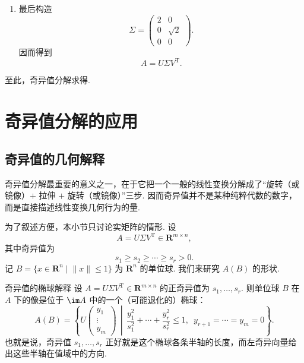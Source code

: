 \begin{solution}
\begin{enumerate}
        \item 最后构造
              \[
                  \Sigma =
                  \begin{pmatrix}
                      2 & 0        \\
                      0 & \sqrt{2} \\
                      0 & 0
                  \end{pmatrix}.
              \]
              因而得到
              \[
                  A = U\Sigma V^{\mathrm{T}}.
              \]
    \end{enumerate}

    至此，奇异值分解求得.
\end{solution}

\section{奇异值分解的应用}

\subsection{奇异值的几何解释}

奇异值分解最重要的意义之一，在于它把一个一般的线性变换分解成了“旋转（或镜像）$+$ 拉伸 $+$ 旋转（或镜像）”三步. 因而奇异值并不是某种纯粹代数的数字，而是直接描述线性变换几何行为的量.

为了叙述方便，本小节只讨论实矩阵的情形. 设
\[
    A = U\Sigma V^{\mathrm{T}} \in \mathbf{R}^{m \times n},
\]
其中奇异值为
\[
    s_1 \geqslant s_2 \geqslant \cdots \geqslant s_r > 0.
\]
记 $ B = \{x \in \mathbf{R}^n \mid \lVert x \rVert \leqslant 1\} $ 为 $ \mathbf{R}^n $ 的单位球. 我们来研究 $ A(B) $ 的形状.

\begin{theorem}{}{奇异值的椭球解释}
    设 $ A = U\Sigma V^{\mathrm{T}} \in \mathbf{R}^{m \times n} $ 的正奇异值为 $ s_1, \ldots, s_r $. 则单位球 $ B $ 在 $ A $ 下的像是位于 $ \im A $ 中的一个（可能退化的）椭球：
    \[
        A(B) =
        \left\{
            U
            \begin{pmatrix}
                y_1 \\
                \vdots \\
                y_m
            \end{pmatrix}
            \,\middle|\,
            \frac{y_1^2}{s_1^2} + \cdots + \frac{y_r^2}{s_r^2} \leqslant 1,\enspace
            y_{r+1} = \cdots = y_m = 0
        \right\}.
    \]
    也就是说，奇异值 $ s_1, \ldots, s_r $ 正好就是这个椭球各条半轴的长度，而左奇异向量给出这些半轴在值域中的方向.
\end{theorem}

